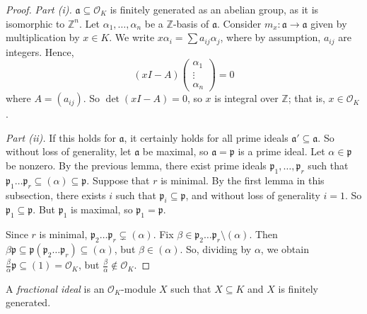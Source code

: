 \begin{proof}
    \emph{Part (i).}
    \( \mathfrak a \subseteq \mathcal O_K \) is finitely generated as an abelian group, as it is isomorphic to \( \mathbb Z^n \).
    Let \( \alpha_1, \dots, \alpha_n \) be a \( \mathbb Z \)-basis of \( \mathfrak a \).
    Consider \( m_x \colon \mathfrak a \to \mathfrak a \) given by multiplication by \( x \in K \).
    We write \( x \alpha_i = \sum a_{ij} \alpha_j \), where by assumption, \( a_{ij} \) are integers.
    Hence,
    \[ (xI - A) \begin{pmatrix}
        \alpha_1 \\
        \vdots \\
        \alpha_n
    \end{pmatrix} = 0 \]
    where \( A = (a_{ij}) \).
    So \( \det(xI - A) = 0 \), so \( x \) is integral over \( \mathbb Z \); that is, \( x \in \mathcal O_K \).

    \emph{Part (ii).}
    If this holds for \( \mathfrak a \), it certainly holds for all prime ideals \( \mathfrak a' \subseteq \mathfrak a \).
    So without loss of generality, let \( \mathfrak a \) be maximal, so \( \mathfrak a = \mathfrak p \) is a prime ideal.
    Let \( \alpha \in \mathfrak p \) be nonzero.
    By the previous lemma, there exist prime ideals \( \mathfrak p_1, \dots, \mathfrak p_r \) such that \( \mathfrak p_1 \dots \mathfrak p_r \subseteq (\alpha) \subseteq \mathfrak p \).
    Suppose that \( r \) is minimal.
    By the first lemma in this subsection, there exists \( i \) such that \( \mathfrak p_i \subseteq \mathfrak p \), and without loss of generality \( i = 1 \).
    So \( \mathfrak p_1 \subseteq \mathfrak p \).
    But \( \mathfrak p_1 \) is maximal, so \( \mathfrak p_1 = \mathfrak p \).

    Since \( r \) is minimal, \( \mathfrak p_2 \dots \mathfrak p_r \subsetneq (\alpha) \).
    Fix \( \beta \in \mathfrak p_2 \dots \mathfrak p_r \setminus (\alpha) \).
    Then \( \beta \mathfrak p \subseteq \mathfrak p (\mathfrak p_2 \dots \mathfrak p_r) \subseteq (\alpha) \), but \( \beta \in (\alpha) \).
    So, dividing by \( \alpha \), we obtain \( \frac{\beta}{\alpha} \mathfrak p \subseteq (1) = \mathcal O_K \), but \( \frac{\beta}{\alpha} \not\in \mathcal O_K \).
\end{proof}
\begin{definition}
    A \emph{fractional ideal} is an \( \mathcal O_K \)-module \( X \) such that \( X \subseteq K \) and \( X \) is finitely generated.
\end{definition}
